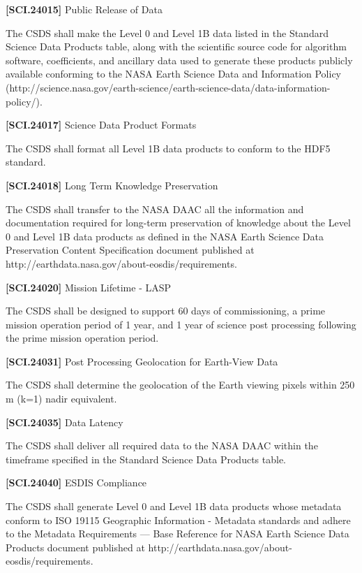 \textbf{[SCI.24015]} Public Release of Data

The \gls{CSDS} shall make the Level 0 and Level 1B data listed in the Standard Science Data Products table, along with the scientific source code for algorithm software, coefficients, and ancillary data used to generate these products publicly available conforming to the NASA Earth Science Data and Information Policy (http:\slash \slash science.nasa.gov\slash earth-science\slash earth-science-data\slash data-information-policy\slash ).

\textbf{[SCI.24017]} Science Data Product Formats

The \gls{CSDS} shall format all Level 1B data products to conform to the HDF5 standard.

\textbf{[SCI.24018]} Long Term Knowledge Preservation

The \gls{CSDS} shall transfer to the NASA \gls{DAAC} all the information and documentation required for long-term preservation of knowledge about the Level 0 and Level 1B data products as defined in the NASA Earth Science Data Preservation Content Specification document published at http:\slash \slash earthdata.nasa.gov\slash about-eosdis\slash requirements.

\textbf{[SCI.24020]} Mission Lifetime - \gls{LASP}

The \gls{CSDS} shall be designed to support 60 days of commissioning, a prime mission operation period of 1 year, and 1 year of science post processing following the prime mission operation period.

\textbf{[SCI.24031]} Post Processing Geolocation for Earth-View Data

The \gls{CSDS} shall determine the geolocation of the Earth viewing pixels within 250 m (k=1) nadir equivalent.

\textbf{[SCI.24035]} Data Latency

The \gls{CSDS} shall deliver all required data to the NASA \gls{DAAC} within the timeframe specified in the Standard Science Data Products table.

\textbf{[SCI.24040]} \gls{ESDIS} Compliance

The \gls{CSDS} shall generate Level 0 and Level 1B data products whose metadata conform to ISO 19115 Geographic Information - Metadata standards and adhere to the Metadata Requirements --- Base Reference for NASA Earth Science Data Products document published at http:\slash \slash earthdata.nasa.gov\slash about-eosdis\slash requirements.

